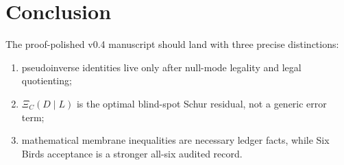 \documentclass[11pt]{article}
\begin{document}
\section{Conclusion}
The proof-polished v0.4 manuscript should land with three precise distinctions:
\begin{enumerate}
  \item pseudoinverse identities live only after null-mode legality and legal quotienting;
  \item $\Xi_C(D\mid L)$ is the optimal blind-spot Schur residual, not a generic error term;
  \item mathematical membrane inequalities are necessary ledger facts, while Six Birds acceptance is a stronger all-six audited record.
\end{enumerate}
\end{document}
